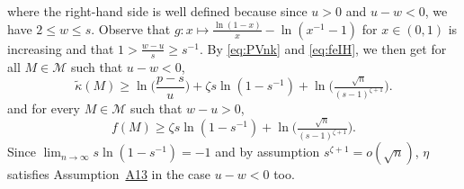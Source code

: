 \documentclass[bj,authoryear]{imsart}
\theoremstyle{plain}
\newcommand{\M}{\mathcal{M}}
\begin{document}
where the right-hand side is well defined because since $u>0$ and $u-w<0$, we have $2\leq w\leq s$. Observe that $g:x \mapsto \frac{\ln(1-x)}{x}-\ln({x}^{-1}-1)$ for $x\in(0,1)$ is increasing and that $1>\frac{w-u}{s} \geq s^{-1}$. By \eqref{eq:PVnk} and \eqref{eq:feIH}, we then get for all $M\in \M$ such that $u-w<0$, 
\begin{equation*}
        \tilde{\kappa}(M) \geq \ln\big(\frac{p-s}{u}\big)+\zeta s\ln(1-s^{-1})+ \ln \big(\tfrac{\sqrt{n}}{(s-1)^{\zeta+1}}\big).
\end{equation*}
and for every $M\in\mathcal{M}$ such that $w-u>0$,
\begin{equation}\label{eq:bounbkappaebicunderfit}
        f(M) \geq \zeta s\ln(1-s^{-1})+ \ln \big(\tfrac{\sqrt{n}}{(s-1)^{\zeta+1}}\big).
\end{equation}
Since $\lim_{n\to\infty}s\ln(1-s^{-1})=-1$ and by assumption $s^{\zeta+1}=o(\sqrt{n})$, $\eta$ satisfies Assumption~\hyperlink{lab:A13}{A13} in the case $u-w<0$ too.
\end{document}
